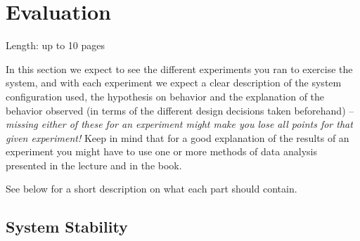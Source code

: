 \documentclass[11pt]{article}
\begin{document}
\section{Evaluation}\label{sec:evaluation}

Length: up to 10 pages

In this section we expect to see the different experiments you ran to
exercise the system, and with each experiment we expect a clear
description of the system configuration used, the hypothesis on behavior
and the explanation of the behavior observed (in terms of the different
design decisions taken beforehand) -- \emph{missing either of these for
an experiment might make you lose all points for that given experiment!}
Keep in mind that for a good explanation of the results of an experiment
you might have to use one or more methods of data analysis presented in
the lecture and in the book.

See below for a short description on what each part should contain.

\subsection{System Stability}\label{sec:system-stability}
\end{document}
